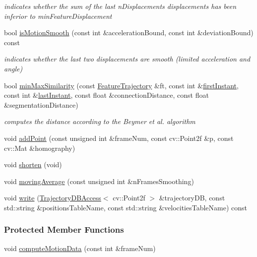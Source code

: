 \begin{DoxyCompactItemize}
\begin{DoxyCompactList}\small\item\em indicates whether the sum of the last n\-Displacements displacements has been inferior to min\-Feature\-Displacement \end{DoxyCompactList}\item 
bool \hyperlink{classFeatureTrajectory_a5cec1557c0e33e1afcf5e52e9ee21111}{is\-Motion\-Smooth} (const int \&acceleration\-Bound, const int \&deviation\-Bound) const 
\begin{DoxyCompactList}\small\item\em indicates whether the last two displacements are smooth (limited acceleration and angle) \end{DoxyCompactList}\item 
bool \hyperlink{classFeatureTrajectory_a7b8bb658b11291150fb2c28b91a6cb68}{min\-Max\-Similarity} (const \hyperlink{classFeatureTrajectory}{Feature\-Trajectory} \&ft, const int \&\hyperlink{classFeatureTrajectory_a2a6edaac8722d353f8168e4149333761}{first\-Instant}, const int \&\hyperlink{classFeatureTrajectory_a3d6bc8bd9e02f2d56deb60f6fb22a36b}{last\-Instant}, const float \&connection\-Distance, const float \&segmentation\-Distance)
\begin{DoxyCompactList}\small\item\em computes the distance according to the Beymer et al. algorithm \end{DoxyCompactList}\item 
void \hyperlink{classFeatureTrajectory_a05b3c3d54530c626dd5fa3ebb570990b}{add\-Point} (const unsigned int \&frame\-Num, const cv\-::\-Point2f \&p, const cv\-::\-Mat \&homography)
\item 
void \hyperlink{classFeatureTrajectory_ae231f87f9b47adc1c91b6edbcf0c7b02}{shorten} (void)
\item 
void \hyperlink{classFeatureTrajectory_a65385ea89ef19a4d33efaa785cbee1f9}{moving\-Average} (const unsigned int \&n\-Frames\-Smoothing)
\item 
void \hyperlink{classFeatureTrajectory_a232e203eb828036647c34eb896752e07}{write} (\hyperlink{classTrajectoryDBAccess}{Trajectory\-D\-B\-Access}$<$ cv\-::\-Point2f $>$ \&trajectory\-D\-B, const std\-::string \&positions\-Table\-Name, const std\-::string \&velocities\-Table\-Name) const 
\end{DoxyCompactItemize}
\subsubsection*{Protected Member Functions}
\begin{DoxyCompactItemize}
\item 
void \hyperlink{classFeatureTrajectory_a27381040900984748ee66f248596cfa1}{compute\-Motion\-Data} (const int \&frame\-Num)
\end{DoxyCompactItemize}

